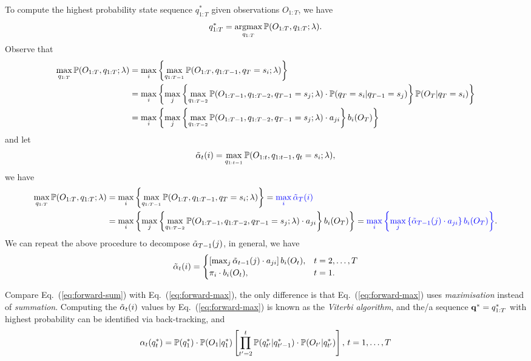 To compute the highest probability state sequence $q_{1:T}^*$ given observations $O_{1:T}$, we have
\begin{equation*}
q_{1:T}^* = \operatorname*{argmax}_{q_{1:T}} \mathbb{P}(O_{1:T}, q_{1:T} ;\lambda).
\end{equation*}
Observe that 
\begin{align*}
\max_{q_{1:T}} \mathbb{P}(O_{1:T}, q_{1:T} ;\lambda) 
&= \max_{i} \left\{ \max_{q_{1:T-1}} \mathbb{P}(O_{1:T}, q_{1:T-1}, q_T = s_i ;\lambda) \right\} \\
&= \max_{i} \left\{ \max_{j} \left\{ \max_{q_{1:T-2}} \mathbb{P}(O_{1:T-1}, q_{1:T-2}, q_{T-1} = s_j ;\lambda) \cdot 
   \mathbb{P}(q_T = s_i |q_{T-1} = s_j) \right\} \mathbb{P}(O_T |q_T = s_i) \right\} \\
&= \max_{i} \left\{ \max_{j} \left\{ \max_{q_{1:T-2}} \mathbb{P}(O_{1:T-1}, q_{1:T-2}, q_{T-1} = s_j ;\lambda) \cdot a_{ji} \right\} b_i(O_T) \right\}
\end{align*}
and let 
\begin{equation}
\label{eq:alphat}
\tilde{\alpha}_{t}(i) = \max_{q_{1:t-1}} \mathbb{P}(O_{1:t}, q_{1:t-1}, q_t = s_i ;\lambda),
\end{equation}
we have
\begin{alignat}{2}
\max_{q_{1:T}} \mathbb{P}(O_{1:T}, q_{1:T} ;\lambda) 
&= \max_{i} \left\{ \max_{q_{1:T-1}} \mathbb{P}(O_{1:T}, q_{1:T-1}, q_T = s_i ;\lambda) \right\} 
 = {\color{blue}{\max_{i} \tilde{\alpha}_{T}(i)}} \label{eq:max-forward} \\
&= \max_{i} \left\{ \max_{j} \left\{ \max_{q_{1:T-2}} \mathbb{P}(O_{1:T-1}, q_{1:T-2}, q_{T-1} = s_j ;\lambda) \cdot a_{ji} \right\} b_i(O_T) \right\}
 = {\color{blue}{\max_{i} \left\{ \max_{j} \left\{ \tilde{\alpha}_{T-1}(j) \cdot a_{ji} \right\} b_i(O_T) \right\}}}. \nonumber
\end{alignat}
We can repeat the above procedure to decompose $\tilde{\alpha}_{T-1}(j)$, in general, we have
\begin{equation}
\label{eq:forward-max}
\tilde{\alpha}_t(i) = \begin{cases}
                \left[ \max_{j} \tilde{\alpha}_{t-1}(j) \cdot a_{ji} \right] b_i(O_t), & t=2,\dots,T \\
                \pi_i \cdot b_i(O_t), & t=1.
               \end{cases}
\end{equation}

Compare Eq.~(\ref{eq:forward-sum}) with Eq.~(\ref{eq:forward-max}), 
the only difference is that Eq.~(\ref{eq:forward-max}) uses \emph{maximisation} instead of \emph{summation}.
Computing the $\tilde{\alpha}_t(i)$ values by Eq.~(\ref{eq:forward-max}) is known as the \emph{Viterbi algorithm}, 
and the/a sequence $\mathbf{q}^* = q_{1:T}^*$ with highest probability can be identified via back-tracking, and
\begin{equation}
\label{eq:alpha-sum}
\alpha_t(q_t^*) = \mathbb{P}(q_1^*) \cdot \mathbb{P}(O_1 |q_1^*) \left[ \prod_{t'=2}^t \mathbb{P}(q_{t'}^* |q_{t'-1}^*) \cdot \mathbb{P}(O_{t'} |q_{t'}^*) \right], \, t = 1,\dots,T
\end{equation}

